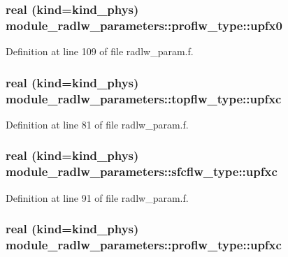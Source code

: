 \subsubsection[{\texorpdfstring{upfx0}{upfx0}}]{\setlength{\rightskip}{0pt plus 5cm}real (kind=kind\+\_\+phys) module\+\_\+radlw\+\_\+parameters\+::proflw\+\_\+type\+::upfx0}\hypertarget{group__module__radlw__main_ga90ec3938bb024acfd6f78d597890e78a}{}\label{group__module__radlw__main_ga90ec3938bb024acfd6f78d597890e78a}


Definition at line 109 of file radlw\+\_\+param.\+f.

\subsubsection[{\texorpdfstring{upfxc}{upfxc}}]{\setlength{\rightskip}{0pt plus 5cm}real (kind=kind\+\_\+phys) module\+\_\+radlw\+\_\+parameters\+::topflw\+\_\+type\+::upfxc}\hypertarget{group__module__radlw__main_ga19ff2669a279a1db869766c0e3d88981}{}\label{group__module__radlw__main_ga19ff2669a279a1db869766c0e3d88981}


Definition at line 81 of file radlw\+\_\+param.\+f.

\subsubsection[{\texorpdfstring{upfxc}{upfxc}}]{\setlength{\rightskip}{0pt plus 5cm}real (kind=kind\+\_\+phys) module\+\_\+radlw\+\_\+parameters\+::sfcflw\+\_\+type\+::upfxc}\hypertarget{group__module__radlw__main_gab281301c9fad950c86a379cdec0963aa}{}\label{group__module__radlw__main_gab281301c9fad950c86a379cdec0963aa}


Definition at line 91 of file radlw\+\_\+param.\+f.

\subsubsection[{\texorpdfstring{upfxc}{upfxc}}]{\setlength{\rightskip}{0pt plus 5cm}real (kind=kind\+\_\+phys) module\+\_\+radlw\+\_\+parameters\+::proflw\+\_\+type\+::upfxc}\hypertarget{group__module__radlw__main_gaefd4bfa2053b7e88173ac73ca219a9b2}{}\label{group__module__radlw__main_gaefd4bfa2053b7e88173ac73ca219a9b2}


